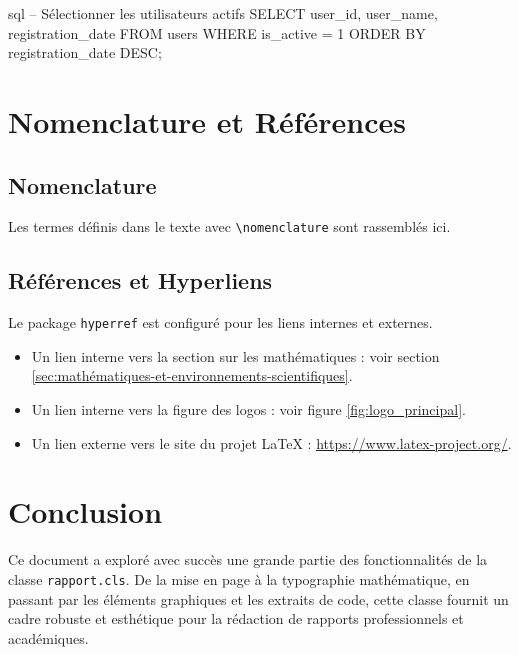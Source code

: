 \documentclass{mytex}
\begin{document}
	\begin{codeboxlang}{sql}
		-- Sélectionner les utilisateurs actifs
		SELECT
		user_id,
		user_name,
		registration_date
		FROM
		users
		WHERE
		is_active = 1
		ORDER BY
		registration_date DESC;
	\end{codeboxlang}
	
	
	\section{Nomenclature et Références}
	
	\subsection{Nomenclature}
	Les termes définis dans le texte avec \verb|\nomenclature| sont rassemblés ici.
	\printnomenclature
	
	\subsection{Références et Hyperliens}
	Le package \texttt{hyperref} est configuré pour les liens internes et externes.
	\begin{itemize}
		\item Un lien interne vers la section sur les mathématiques : voir section \ref{sec:mathématiques-et-environnements-scientifiques}.
		\item Un lien interne vers la figure des logos : voir figure \ref{fig:logo_principal}.
		\item Un lien externe vers le site du projet LaTeX : \url{https://www.latex-project.org/}.
	\end{itemize}
	
	
	\section{Conclusion}
	
	Ce document a exploré avec succès une grande partie des fonctionnalités de la classe \texttt{rapport.cls}. De la mise en page à la typographie mathématique, en passant par les éléments graphiques et les extraits de code, cette classe fournit un cadre robuste et esthétique pour la rédaction de rapports professionnels et académiques.
\end{document}
